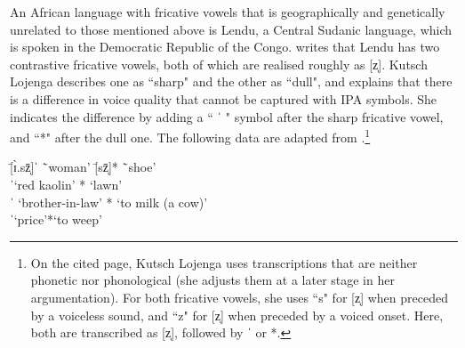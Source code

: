 \documentclass[output=paper,colorlinks,citecolor=brown,chinesefont]{langscibook}
\begin{document}
An African language with fricative vowels that is geographically and genetically unrelated to those mentioned above is Lendu, a Central Sudanic language, which is spoken in the Democratic Republic of the Congo. \citet{Kutsch_Lojenga_1989} writes that Lendu has two contrastive fricative vowels, both of which are realised roughly as [z̩]. Kutsch Lojenga describes one as ``sharp" and the other as ``dull", and explains that there is a difference in voice quality that cannot be captured with IPA symbols. She indicates the difference by adding a `` ˈ " symbol after the sharp fricative vowel, and  ``*" after the dull one. The following data are adapted from \citet[120]{Kutsch_Lojenga_1989}.\footnote{On the cited page, Kutsch Lojenga uses transcriptions that are neither phonetic nor phonological (she adjusts them at a later stage in her argumentation). For both fricative vowels, she uses ``s" for [z̩] when preceded by a voiceless sound, and ``z" for [z̩] when preceded by a voiced onset. Here, both are transcribed as [z̩], followed by ˈ or *.}
\newpage

\ea \label{Lendu_data}
    \begin{tabbing}
        \quad \= [ɪ̀.sz̩̄]ˈ \quad \= `woman' \qquad \qquad \= [sz̩̄]* \quad \= `shoe'\\
        \>[tsž̩]ˈ\>`red kaolin' \>[tsž̩]*\> `lawn'\\
        \>[zz̩̄]ˈ \>`brother-in-law' \> [zz̩̄]* \> `to milk (a cow)'\\
        \>[dzz̩̀]ˈ\>`price'\>[dzz̩̀]*\>`to weep'
    \end{tabbing}
\z
\end{document}
